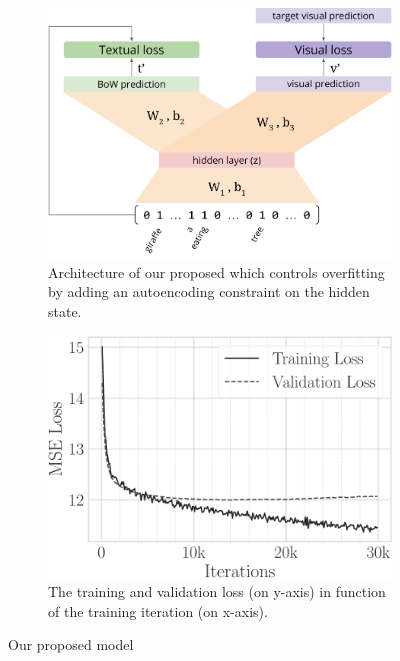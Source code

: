 \begin{figure}
\begin{subfigure}{0.53\linewidth}
\includegraphics[width=\linewidth]{s-t2v-arch}
\caption{Architecture of our proposed \sparsettv{} which controls overfitting by adding an autoencoding constraint on the hidden state.}
\label{fig:t2v:s-t2v:arch}
\end{subfigure}
\hfill
\begin{subfigure}{0.43\linewidth}
\includegraphics[width=\linewidth]{s-t2v-loss}
\caption{The training and validation loss (on y-axis) in function of the training iteration (on x-axis).}
\label{fig:t2v:s-t2v:loss}
\end{subfigure}
\caption{Our proposed \sparsettv{} model}
\label{fig:t2v:s-t2v}
\end{figure}

